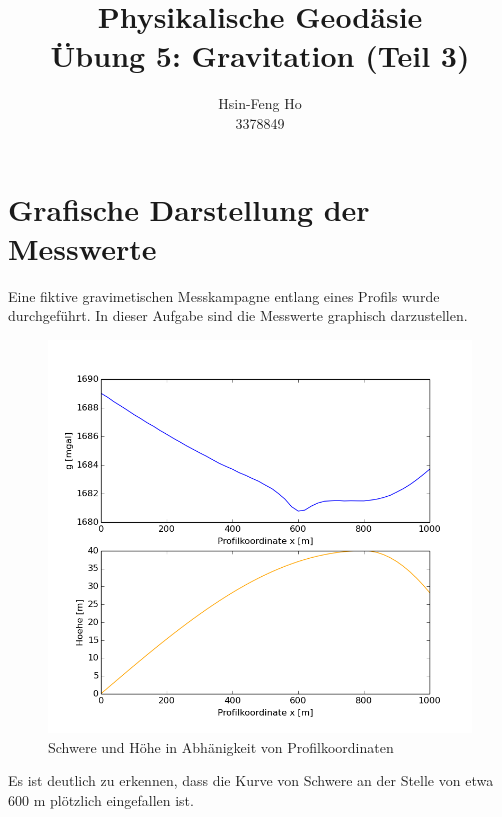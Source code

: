 \documentclass[12pt
,headinclude
,headsepline
,bibtotocnumbered
]{scrartcl}
\begin{document}
	\begin{titlepage}
		\vspace{\fill}
		\title{\textbf{Physikalische Geodäsie \\ Übung 5: Gravitation (Teil 3)}}
		\vspace{5cm}
		\author{Hsin-Feng Ho\\
			3378849}
		\vspace{3cm}
		\maketitle
	\end{titlepage}
\section{Grafische Darstellung der Messwerte}
Eine fiktive gravimetischen Messkampagne entlang eines Profils wurde durchgeführt. In dieser Aufgabe sind die Messwerte graphisch darzustellen.
\begin{figure}[H]
	\includegraphics[width=15cm]{figure_1}
	\caption{Schwere und Höhe in Abhänigkeit von Profilkoordinaten}
\end{figure}
Es ist deutlich zu erkennen, dass die Kurve von Schwere an der Stelle von etwa 600 m plötzlich eingefallen ist.
\end{document}
